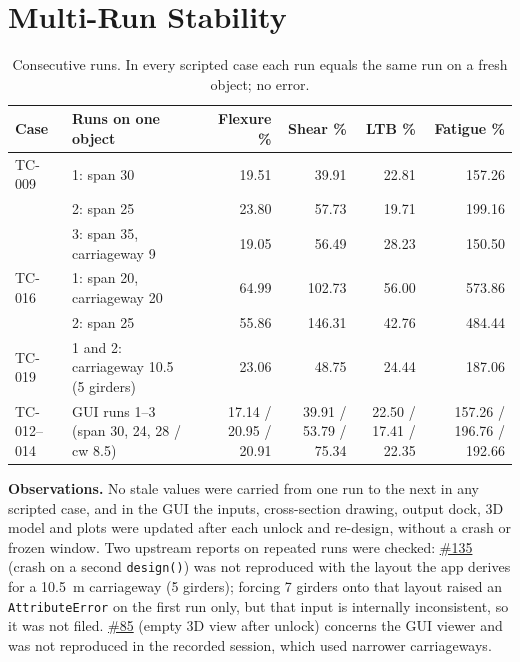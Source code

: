 \documentclass[10pt,a4paper]{article}
\newcommand{\gh}[1]{\href{https://github.com/Nidhikhare12/OsdagBridge/issues/#1}{\##1}}
\begin{document}
\section{Multi-Run Stability}\label{sec:multi}
\begin{table}[H]
\centering\small
\begin{tabular}{@{}L{1.5cm}L{6.2cm}rrrr@{}}
\toprule
\textbf{Case} & \textbf{Runs on one object} & \textbf{Flexure \%} & \textbf{Shear \%} & \textbf{LTB \%} & \textbf{Fatigue \%}\\
\midrule
TC-009 & 1: span 30 & 19.51 & 39.91 & 22.81 & 157.26\\
 & 2: span 25 & 23.80 & 57.73 & 19.71 & 199.16\\
 & 3: span 35, carriageway 9 & 19.05 & 56.49 & 28.23 & 150.50\\
TC-016 & 1: span 20, carriageway 20 & 64.99 & 102.73 & 56.00 & 573.86\\
 & 2: span 25 & 55.86 & 146.31 & 42.76 & 484.44\\
TC-019 & 1 and 2: carriageway 10.5 (5 girders) & 23.06 & 48.75 & 24.44 & 187.06\\
TC-012--014 & GUI runs 1--3 (span 30, 24, 28 / cw 8.5) & 17.14 / 20.95 / 20.91 & 39.91 / 53.79 / 75.34 & 22.50 / 17.41 / 22.35 & 157.26 / 196.76 / 192.66\\
\bottomrule
\end{tabular}
\caption{Consecutive runs. In every scripted case each run equals the same run on a fresh object; no error.}
\end{table}

\textbf{Observations.} No stale values were carried from one run to the next in any scripted case, and in the GUI the inputs, cross-section drawing, output dock, 3D model and plots were updated after each unlock and re-design, without a crash or frozen window. Two upstream reports on repeated runs were checked: \gh{135} (crash on a second \texttt{design()}) was not reproduced with the layout the app derives for a 10.5~m carriageway (5 girders); forcing 7 girders onto that layout raised an \texttt{AttributeError} on the first run only, but that input is internally inconsistent, so it was not filed. \gh{85} (empty 3D view after unlock) concerns the GUI viewer and was not reproduced in the recorded session, which used narrower carriageways.
\end{document}
